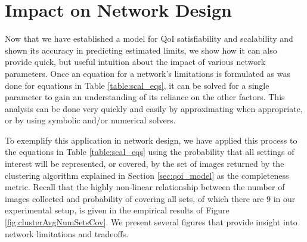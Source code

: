 \section{Impact on Network Design}
\label{sec:network_design}
Now that we have established a model for QoI satisfiability and scalability and shown its accuracy in predicting estimated limits, we show how it can also provide quick, but useful intuition about the impact of various network parameters.  Once an equation for a network's limitations is formulated as was done for equations in Table \ref{table:scal_eqs}, it can be solved for a single parameter to gain an understanding of its reliance on the other factors.  This analysis can be done very quickly and easily by approximating when appropriate, or by using symbolic and/or numerical solvers.  

To exemplify this application in network design, we have applied this process to the equations in Table \ref{table:scal_eqs} using the probability that all settings of interest will be represented, or covered, by the set of images returned by the clustering algorithm explained in Section \ref{sec:qoi_model} as the completeness metric.  Recall that the highly non-linear relationship between the number of images collected and probability of covering all sets, of which there are $9$ in our experimental setup, is given in the empirical results of Figure \ref{fig:clusterAvgNumSetsCov}.  We present several figures that provide insight into network limitations and tradeoffs. 


